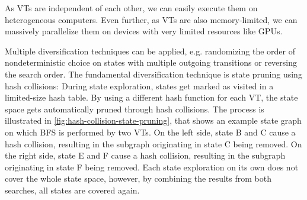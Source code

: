 \documentclass[
fancyheadings, %
%
%
]{stsreprt}
\begin{document}

As VTs are independent of each other, we can easily execute them on heterogeneous computers.
Even further, as VTs are also memory-limited, we can massively parallelize them on devices with very limited resources like GPUs.

Multiple diversification techniques can be applied, e.g. randomizing the order of nondeterministic choice on states with multiple outgoing transitions or reversing the search order.
The fundamental diversification technique is state pruning using hash collisions:
During state exploration, states get marked as visited in a limited-size hash table.
By using a different hash function for each VT, the state space gets automatically pruned through hash collisions.
The process is illustrated in \cref{fig:hash-collision-state-pruning}, that shows an example state graph on which BFS is performed by two VTs.
On the left side, state B and C cause a hash collision, resulting in the subgraph originating in state C being removed.
On the right side, state E and F cause a hash collision, resulting in the subgraph originating in state F being removed.
Each state exploration on its own does not cover the whole state space, however, by combining the results from both searches, all states are covered again.
\end{document}
